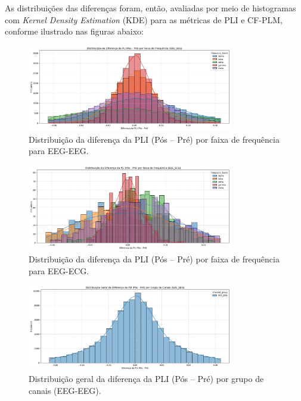 As distribuições das diferenças foram, então, avaliadas por meio de histogramas com \emph{Kernel Density Estimation} (KDE) para as métricas de PLI e CF-PLM, conforme ilustrado nas figuras abaixo:

\begin{figure}[htb]
    \centering
    \includegraphics[width=0.8\textwidth]{figs/6_distribuicao_metricas_conectividade/Distribuição_da_Diferença_da_PLI_(Pós_-_Pré)_por_Faixa_de_Frequência_EEG_EEG.png}
    \caption{Distribuição da diferença da PLI (Pós -- Pré) por faixa de frequência para EEG-EEG.}
    \label{fig:pli_freq_eeg_eeg}
\end{figure}

\begin{figure}[htb]
    \centering
    \includegraphics[width=0.8\textwidth]{figs/6_distribuicao_metricas_conectividade/Distribuição_da_Diferença_da_PLI_(Pós_-_Pré)_por_Faixa_de_Frequência_EEG_ECG.png}
    \caption{Distribuição da diferença da PLI (Pós -- Pré) por faixa de frequência para EEG-ECG.}
    \label{fig:pli_freq_eeg_ecg}
\end{figure}

\begin{figure}[htb]
    \centering
    \includegraphics[width=0.8\textwidth]{figs/6_distribuicao_metricas_conectividade/Distribuição_Geral_da_Diferença_da_PLI_(Pós_-_Pré)_por_Grupo_de_Canais_EEG_EEG.png}
    \caption{Distribuição geral da diferença da PLI (Pós -- Pré) por grupo de canais (EEG-EEG).}
    \label{fig:pli_channel_eeg_eeg}
\end{figure}

